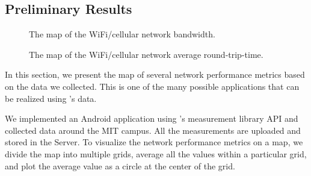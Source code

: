 \subsection{Preliminary Results}
\label{ss:results}

\begin{figure}[t]
  \caption{
    The map of the WiFi/cellular network bandwidth.
  }
  \label{fig:bw}
\end{figure}

\begin{figure}[t]
  \caption{
    The map of the WiFi/cellular network average round-trip-time.
  }
  \label{fig:rtt}
\end{figure}

In this section, we present the map of several network performance
metrics based on the data we collected. This is one of the many possible 
applications that can be realized using \name{}'s data. 

We implemented an Android application using \name{}'s measurement 
library API and collected data around the MIT campus. 
All the measurements are uploaded and stored in the \name{} Server.
To visualize the network performance metrics on a map, we divide the map
into multiple grids, average all the values within a particular grid, and
plot the average value as a circle at the center of the grid. 

